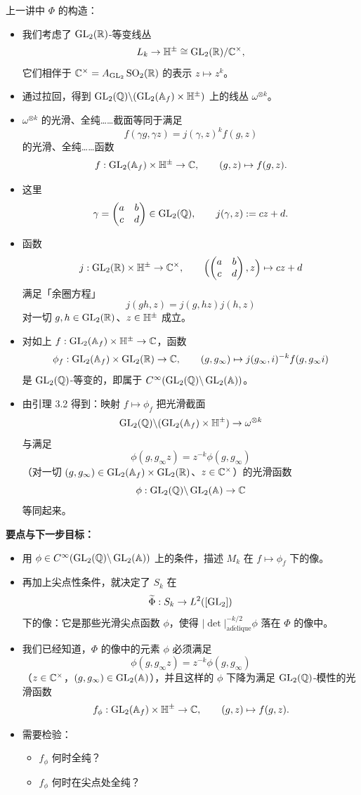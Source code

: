 上一讲中 $\Phi$ 的构造：
\begin{itemize}
\item 我们考虑了 $\operatorname{GL}_2(\mathbb{R})$-等变线丛
\[
L_k\to\mathbb{H}^\pm\cong\operatorname{GL}_2(\mathbb{R})/\mathbb{C}^\times,
\]
它们相伴于 $\mathbb{C}^\times=A_{\operatorname{GL}_2}\operatorname{SO}_2(\mathbb{R})$ 的表示 $z\mapsto z^k$。
\item 通过拉回，得到 $\operatorname{GL}_2(\mathbb{Q})\backslash(\operatorname{GL}_2(\mathbb{A}_f)\times\mathbb{H}^\pm)$ 上的线丛 $\omega^{\otimes k}$。
\item $\omega^{\otimes k}$ 的光滑、全纯……截面等同于满足
\[
f(\gamma g,\gamma z)=j(\gamma,z)^kf(g,z)
\]
的光滑、全纯……函数
\[
f:\operatorname{GL}_2(\mathbb{A}_f)\times\mathbb{H}^\pm\to\mathbb{C},\qquad(g,z)\mapsto f(g,z).
\]
\item 这里
\[
\gamma=\begin{pmatrix}a&b\\c&d\end{pmatrix}\in\operatorname{GL}_2(\mathbb{Q}),\qquad j(\gamma,z):=cz+d.
\]
\item 函数
\[
j:\operatorname{GL}_2(\mathbb{R})\times\mathbb{H}^\pm\to\mathbb{C}^\times,\qquad
\Bigl(\begin{pmatrix}a&b\\c&d\end{pmatrix},z\Bigr)\mapsto cz+d
\]
满足「余圈方程」
\[
j(gh,z)=j(g,hz)j(h,z)
\]
对一切 $g,h\in\operatorname{GL}_2(\mathbb{R})$、$z\in\mathbb{H}^\pm$ 成立。
\item 对如上 $f:\operatorname{GL}_2(\mathbb{A}_f)\times\mathbb{H}^\pm\to\mathbb{C}$，函数
\[
\phi_f:\operatorname{GL}_2(\mathbb{A}_f)\times\operatorname{GL}_2(\mathbb{R})\to\mathbb{C},\qquad
(g,g_\infty)\mapsto j(g_\infty,i)^{-k}f(g,g_\infty i)
\]
是 $\operatorname{GL}_2(\mathbb{Q})$-等变的，即属于 $C^\infty(\operatorname{GL}_2(\mathbb{Q})\backslash\operatorname{GL}_2(\mathbb{A}))$。
\item 由引理 3.2 得到：映射 $f\mapsto\phi_f$ 把光滑截面
\[
\operatorname{GL}_2(\mathbb{Q})\backslash(\operatorname{GL}_2(\mathbb{A}_f)\times\mathbb{H}^\pm)\to\omega^{\otimes k}
\]
与满足
\[
\phi(g,g_\infty z)=z^{-k}\phi(g,g_\infty)
\]
（对一切 $(g,g_\infty)\in\operatorname{GL}_2(\mathbb{A}_f)\times\operatorname{GL}_2(\mathbb{R})$、$z\in\mathbb{C}^\times$）的光滑函数
\[
\phi:\operatorname{GL}_2(\mathbb{Q})\backslash\operatorname{GL}_2(\mathbb{A})\to\mathbb{C}
\]
等同起来。
\end{itemize}

\textbf{要点与下一步目标：}
\begin{itemize}
\item 用 $\phi\in C^\infty(\operatorname{GL}_2(\mathbb{Q})\backslash\operatorname{GL}_2(\mathbb{A}))$ 上的条件，描述 $M_k$ 在 $f\mapsto\phi_f$ 下的像。
\item 再加上尖点性条件，就决定了 $S_k$ 在
\[
\widetilde\Phi:S_k\to L^2([\operatorname{GL}_2])
\]
下的像：它是那些光滑尖点函数 $\phi$，使得 $|\det|^{-k/2}_{\mathrm{ad\acute{e}lique}}\phi$ 落在 $\Phi$ 的像中。
\item 我们已经知道，$\Phi$ 的像中的元素 $\phi$ 必须满足
\[
\phi(g,g_\infty z)=z^{-k}\phi(g,g_\infty)
\]
（$z\in\mathbb{C}^\times$，$(g,g_\infty)\in\operatorname{GL}_2(\mathbb{A})$），并且这样的 $\phi$ 下降为满足 $\operatorname{GL}_2(\mathbb{Q})$-模性的光滑函数
\[
f_\phi:\operatorname{GL}_2(\mathbb{A}_f)\times\mathbb{H}^\pm\to\mathbb{C},\qquad(g,z)\mapsto f(g,z).
\]
\item 需要检验：
\begin{itemize}
\item $f_\phi$ 何时全纯？
\item $f_\phi$ 何时在尖点处全纯？
\end{itemize}
\end{itemize}

